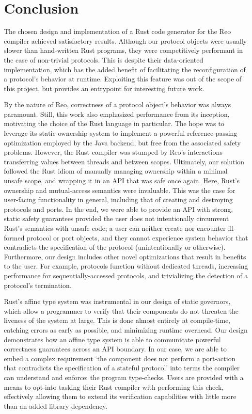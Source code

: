 \section{Conclusion}

The chosen design and implementation of a Rust code generator for the Reo compiler achieved satisfactory results. Although our protocol objects were usually slower than hand-written Rust programs, they were competitively performant in the case of non-trivial protocols. This is despite their data-oriented implementation, which has the added benefit of facilitating the reconfiguration of a protocol's behavior at runtime. Exploiting this feature was out of the scope of this project, but provides an entrypoint for interesting future work.

By the nature of Reo, correctness of a protocol object's behavior was always paramount. Still, this work also emphasized performance from its inception, motivating the choice of the Rust language in particular. The hope was to leverage its static ownership system to implement a powerful reference-passing optimization employed by the Java backend, but free from the associated safety problems. However, the Rust compiler was stumped by Reo's interactions transferring values between threads and between scopes. Ultimately, our solution followed the Rust idiom of manually managing ownership within a minimal unsafe scope, and wrapping it in an API that was safe once again. Here, Rust's ownership and mutual-access semantics were invaluable. This was the case for user-facing functionality in general, including that of creating and destroying protocols and ports. In the end, we were able to provide an API with strong, static safety guarantees provided the user does not intentionally circumvent Rust's semantics with unsafe code; a user can neither create nor encounter ill-formed protocol or port objects, and they cannot experience system behavior that contradicts the specification of the protocol (unintentionally or otherwise). Furthermore, our design includes other novel optimizations that result in benefits to the user. For example, protocols function without dedicated threads, increasing performance for sequentially-accessed protocols, and trivializing the detection of a protocol's termination.

Rust's affine type system was instrumental in our design of static governors, which allow a programmer to verify that their components do not threaten the liveness of the system at large. This is done almost entirely at compile-time, catching errors as early as possible, and minimizing runtime overhead. Our design demonstrates how an affine type system is able to communicate powerful correctness guarantees across an API boundary. In our case, we are able to embed a complex requirement `the component does not perform a port-action that contradicts the specification of a stateful protocol' into terms the compiler can understand and enforce: the program type-checks. Users are provided with a means to opt-into tasking their Rust compiler with performing this check, effectively allowing them to extend its verification capabilities with little more than an added library dependency. 



